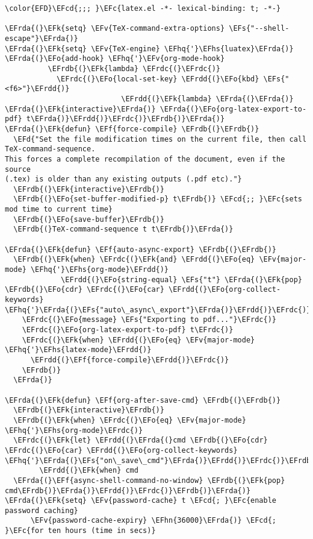 \documentclass[a4wide,10pt]{article}
\newcommand{\EFc}[1]{\textcolor{EFc}{#1}} %
\newcommand{\EFcd}[1]{\textcolor{EFcd}{#1}} %
\newcommand{\EFs}[1]{\textcolor{EFs}{#1}} %
\newcommand{\EFd}[1]{\textcolor{EFd}{#1}} %
\newcommand{\EFk}[1]{\textcolor{EFk}{#1}} %
\newcommand{\EFf}[1]{\textcolor{EFf}{#1}} %
\newcommand{\EFv}[1]{\textcolor{EFv}{#1}} %
\newcommand{\EFo}[1]{\textcolor{EFo}{#1}} %
\newcommand{\EFhn}[1]{\textcolor{EFhn}{\textbf{#1}}} %
\newcommand{\EFhq}[1]{\textcolor{EFhq}{#1}} %
\newcommand{\EFhs}[1]{\textcolor{EFhs}{#1}} %
\newcommand{\EFrda}[1]{\textcolor{EFrda}{#1}} %
\newcommand{\EFrdb}[1]{\textcolor{EFrdb}{#1}} %
\newcommand{\EFrdc}[1]{\textcolor{EFrdc}{#1}} %
\newcommand{\EFrdd}[1]{\textcolor{EFrdd}{#1}} %
\begin{document}
\begin{Code}
\begin{Verbatim}
\color{EFD}\EFcd{;;; }\EFc{latex.el -*- lexical-binding: t; -*-}

\EFrda{(}\EFk{setq} \EFv{TeX-command-extra-options} \EFs{"--shell-escape"}\EFrda{)}
\EFrda{(}\EFk{setq} \EFv{TeX-engine} \EFhq{'}\EFhs{luatex}\EFrda{)}
\EFrda{(}\EFo{add-hook} \EFhq{'}\EFv{org-mode-hook}
          \EFrdb{(}\EFk{lambda} \EFrdc{(}\EFrdc{)}
            \EFrdc{(}\EFo{local-set-key} \EFrdd{(}\EFo{kbd} \EFs{"<f6>"}\EFrdd{)}
                           \EFrdd{(}\EFk{lambda} \EFrda{(}\EFrda{)} \EFrda{(}\EFk{interactive}\EFrda{)} \EFrda{(}\EFo{org-latex-export-to-pdf} t\EFrda{)}\EFrdd{)}\EFrdc{)}\EFrdb{)}\EFrda{)}
\EFrda{(}\EFk{defun} \EFf{force-compile} \EFrdb{(}\EFrdb{)}
  \EFd{"Set the file modification times on the current file, then call
TeX-command-sequence.
This forces a complete recompilation of the document, even if the source
(.tex) is older than any existing outputs (.pdf etc)."}
  \EFrdb{(}\EFk{interactive}\EFrdb{)}
  \EFrdb{(}\EFo{set-buffer-modified-p} t\EFrdb{)} \EFcd{;; }\EFc{sets mod time to current time}
  \EFrdb{(}\EFo{save-buffer}\EFrdb{)}
  \EFrdb{(}TeX-command-sequence t t\EFrdb{)}\EFrda{)}

\EFrda{(}\EFk{defun} \EFf{auto-async-export} \EFrdb{(}\EFrdb{)}
  \EFrdb{(}\EFk{when} \EFrdc{(}\EFk{and} \EFrdd{(}\EFo{eq} \EFv{major-mode} \EFhq{'}\EFhs{org-mode}\EFrdd{)}
             \EFrdd{(}\EFo{string-equal} \EFs{"t"} \EFrda{(}\EFk{pop} \EFrdb{(}\EFo{cdr} \EFrdc{(}\EFo{car} \EFrdd{(}\EFo{org-collect-keywords} \EFhq{'}\EFrda{(}\EFs{"auto\_async\_export"}\EFrda{)}\EFrdd{)}\EFrdc{)}\EFrdb{)}\EFrda{)}\EFrdd{)}\EFrdc{)}
    \EFrdc{(}\EFo{message} \EFs{"Exporting to pdf..."}\EFrdc{)}
    \EFrdc{(}\EFo{org-latex-export-to-pdf} t\EFrdc{)}
    \EFrdc{(}\EFk{when} \EFrdd{(}\EFo{eq} \EFv{major-mode} \EFhq{'}\EFhs{latex-mode}\EFrdd{)}
      \EFrdd{(}\EFf{force-compile}\EFrdd{)}\EFrdc{)}
    \EFrdb{)}
  \EFrda{)}

\EFrda{(}\EFk{defun} \EFf{org-after-save-cmd} \EFrdb{(}\EFrdb{)}
  \EFrdb{(}\EFk{interactive}\EFrdb{)}
  \EFrdb{(}\EFk{when} \EFrdc{(}\EFo{eq} \EFv{major-mode} \EFhq{'}\EFhs{org-mode}\EFrdc{)}
  \EFrdc{(}\EFk{let} \EFrdd{(}\EFrda{(}cmd \EFrdb{(}\EFo{cdr} \EFrdc{(}\EFo{car} \EFrdd{(}\EFo{org-collect-keywords} \EFhq{'}\EFrda{(}\EFs{"on\_save\_cmd"}\EFrda{)}\EFrdd{)}\EFrdc{)}\EFrdb{)}\EFrda{)}\EFrdd{)}
        \EFrdd{(}\EFk{when} cmd
  \EFrda{(}\EFf{async-shell-command-no-window} \EFrdb{(}\EFk{pop} cmd\EFrdb{)}\EFrda{)}\EFrdd{)}\EFrdc{)}\EFrdb{)}\EFrda{)}
\EFrda{(}\EFk{setq} \EFv{password-cache} t \EFcd{; }\EFc{enable password caching}
      \EFv{password-cache-expiry} \EFhn{36000}\EFrda{)} \EFcd{; }\EFc{for ten hours (time in secs)}


\end{Verbatim}
\end{Code}
\end{document}

